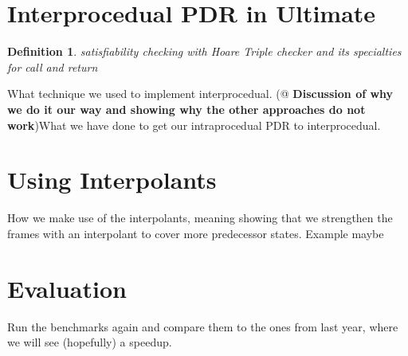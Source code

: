 \documentclass{article}
\newtheorem{mydef}{Definition}
\begin{document}
	
	\section{Interprocedual PDR in Ultimate}
	
		
	\begin{mydef}
		satisfiability checking with Hoare Triple checker and its specialties for call and return
	\end{mydef}
	
	What technique we used to implement interprocedual. (@ \textbf{Discussion of why we do it our way and showing why the other approaches do not work})What we have done to get our intraprocedual PDR to interprocedual.
	
	\section{Using Interpolants}
	How we make use of the interpolants, meaning showing that we strengthen the frames with an interpolant to cover more predecessor states. Example maybe
	
	\section{Evaluation}
	Run the benchmarks again and compare them to the ones from last year, where we will see (hopefully) a speedup.
	
	\pagebreak
	



	
\end{document}
